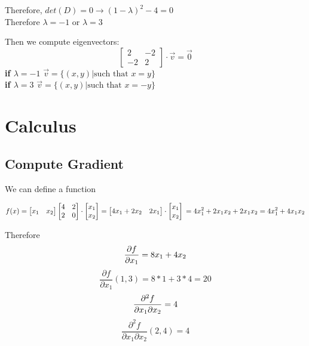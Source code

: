 \documentclass[11pt]{article}
\begin{document}
Therefore, \(det(D) = 0 \rightarrow (1-\lambda)^{2} - 4 = 0 \)  \\
Therefore \(\lambda  = -1 \) or \( \lambda  = 3 \)

Then we compute eigenvectors: 
\[
\begin{bmatrix}
    2 & -2 \\
    -2 & 2
\end{bmatrix} \cdot \vec{v} = \vec{0}
\]
\textbf{if \(\lambda = -1\)} \(\vec{v} = \{(x,y) | \text{such that } x = y \}\)
\\
\textbf{if \(\lambda = 3\)} \(\vec{v} = \{(x,y) | \text{such that } x = -y \}\)

\newpage

\section{Calculus}
\subsection{Compute Gradient}

We can define a function

\[
    f(x) = \begin{bmatrix} x_1 & x_2 \end{bmatrix} \begin{bmatrix} 4 & 2 \\ 2 & 0\end{bmatrix} \cdot \begin{bmatrix} x_1 \\ x_2\end{bmatrix} 
    = \begin{bmatrix}
        4 x_{1} + 2 x_{2} & 2 x_{1}
    \end{bmatrix} \cdot \begin{bmatrix}
        x_1 \\
        x_2
    \end{bmatrix}\\
    = 4x_{1}^{2} + 2 x_1 x_2 + 2x_1 x_2 \\
    = 4x_{1}^{2} + 4x_1 x_2       
\]

Therefore
\[
    \frac{\partial{f}}{\partial{x_1}} = 8x_1 + 4x_2 \\
\]
\[
    \frac{\partial{f}}{\partial{x_1}}(1,3) =  8 * 1 + 3 * 4 = 20
\]
\[
    \frac{\partial^{2}{f}}{\partial{x_1}\partial{x_2}} = 4\\
\]
\[
    \frac{\partial^{2}{f}}{\partial{x_1}\partial{x_2}}(2,4) = 4
\]
\end{document}
